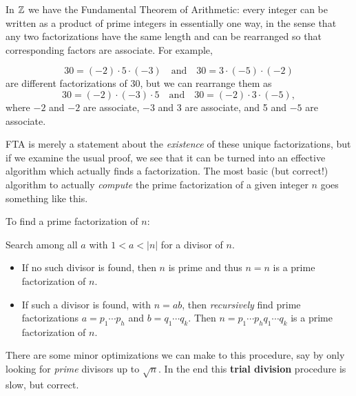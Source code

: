 In \(\mathbb{Z}\) we have the Fundamental Theorem of Arithmetic: every integer can be written as a product of prime integers in essentially one way, in the sense that any two factorizations have the same length and can be rearranged so that corresponding factors are associate.
For example,

\[ 30 = (-2) \cdot 5 \cdot (-3) \quad \mathrm{and} \quad 30 = 3 \cdot (-5) \cdot (-2) \] are different factorizations of 30, but we can rearrange them as \[ 30 = (-2) \cdot (-3) \cdot 5 \quad \mathrm{and} \quad 30 = (-2) \cdot 3 \cdot (-5), \] where \(-2\) and \(-2\) are associate, \(-3\) and 3 are associate, and 5 and \(-5\) are associate.

FTA is merely a statement about the \emph{existence} of these unique factorizations, but if we examine the usual proof, we see that it can be turned into an effective algorithm which actually finds a factorization.
The most basic (but correct!) algorithm to actually \emph{compute} the prime factorization of a given integer \(n\) goes something like this.

\begin{framed}
\noindent To find a prime factorization of \(n\):

Search among all \(a\) with \(1 < a < |n|\) for a divisor of \(n\).
\begin{itemize}
\item If no such divisor is found, then \(n\) is prime and thus \(n = n\) is a prime factorization of \(n\).
\item If such a divisor is found, with \(n = ab\), then \emph{recursively} find prime factorizations \(a = p_1 \cdots p_h\) and \(b = q_1 \cdots q_k\).
Then \(n = p_1 \cdots p_h q_1 \cdots q_k\) is a prime factorization of \(n\).
\end{itemize}
\end{framed}

There are some minor optimizations we can make to this procedure, say by only looking for \emph{prime} divisors up to \(\sqrt{n}\).
In the end this \textbf{trial division} procedure is slow, but correct.

